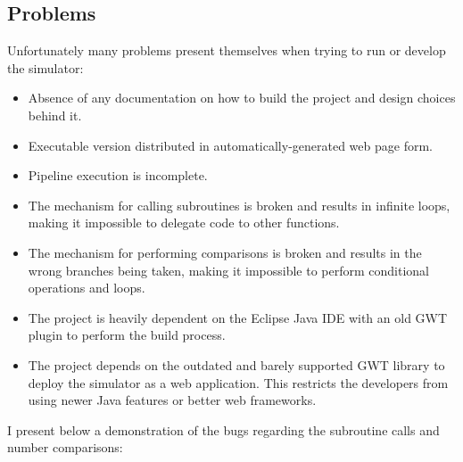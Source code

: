 \subsection*{Problems}

Unfortunately many problems present themselves when trying to run or develop the simulator:

\begin{itemize}[label=\textendash]
	\item Absence of any documentation on how to build the project and design choices behind it.
	\item Executable version distributed in automatically-generated web page form.
	\item Pipeline execution is incomplete.
	\item The mechanism for calling subroutines is broken and results in infinite loops, making it impossible to delegate code to other functions.
	\item The mechanism for performing comparisons is broken and results in the wrong branches being taken, making it impossible to perform conditional operations and loops.
	\item The project is heavily dependent on the Eclipse Java IDE with an old GWT plugin to perform the build process.
	\item The project depends on the outdated and barely supported GWT library to deploy the simulator as a web application. This restricts the developers from using newer Java features or better web frameworks.
\end{itemize}


I present below a demonstration of the bugs regarding the subroutine calls and number comparisons:

